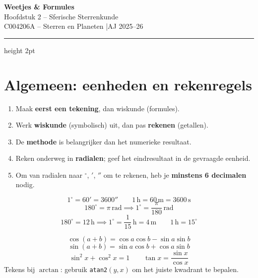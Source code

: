 \documentclass[11pt, a4paper]{article}
\newcommand{\graden}{^{\circ}}
\newcommand{\boogmin}{'}
\newcommand{\boogsec}{''}
\begin{document}

\begin{center}
  {\LARGE\bfseries\color{blauw} Weetjes \& Formules}\\[4pt]
  {\large Hoofdstuk 2 – Sferische Sterrenkunde}\\[2pt]
  {\normalsize C004206A – Sterren en Planeten \quad|\quad AJ 2025--26}
\end{center}
\vspace{0.3cm}
\hrule height 2pt \vspace{0.5cm}

\tableofcontents

\newpage

\section{Algemeen: eenheden en rekenregels}

\begin{weetje}[Werkmethode]
\begin{enumerate}[leftmargin=1.5em]
  \item Maak \textbf{eerst een tekening}, dan wiskunde (formules).
  \item Werk \textbf{wiskunde} (symbolisch) uit, dan pas \textbf{rekenen} (getallen).
  \item De \textbf{methode} is belangrijker dan het numerieke resultaat.
  \item Reken onderweg in \textbf{radialen}; geef het eindresultaat in de gevraagde eenheid.
  \item Om van radialen naar $\graden$, $\boogmin$, $\boogsec$ om te rekenen, heb je \textbf{minstens 6 decimalen} nodig.
\end{enumerate}
\end{weetje}

\begin{formule}[Eenheidsomrekeningen]
\[
  1\graden = 60\boogmin = 3600\boogsec \qquad
  1\,\mathrm{h} = 60\,\mathrm{m} = 3600\,\mathrm{s}
\]
\[
  180\graden = \pi\,\text{rad} \implies 1\graden = \frac{\pi}{180}\,\text{rad}
\]
\[
  180\graden = 12\,\mathrm{h} \implies 1\graden = \frac{1}{15}\,\mathrm{h} = 4\,\mathrm{m}
  \qquad 1\,\mathrm{h} = 15\graden
\]
\end{formule}

\begin{tip}
\[
  \cos(a+b) = \cos a\cos b - \sin a\sin b
\]
\[
  \sin(a+b) = \sin a\cos b + \cos a\sin b
\]
\[
  \sin^2 x + \cos^2 x = 1 \qquad \tan x = \frac{\sin x}{\cos x}
\]
Tekens bij $\arctan$: gebruik \texttt{atan2}$(y,x)$ om het juiste kwadrant te bepalen.
\end{tip}
\end{document}
